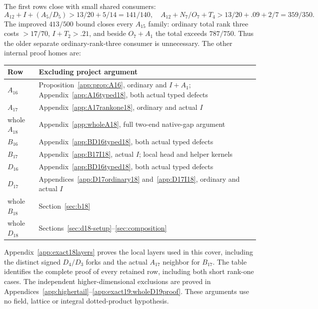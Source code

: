 \documentclass[11pt]{article}
\theoremstyle{definition}
\theoremstyle{remark}
\begin{document}
The first rows close with small shared consumers:
\[
 A_{12}+I+(A_5/D_5)>13/20+5/14=141/140,\quad
 A_{12}+N_7/O_7+T_4>13/20+.09+2/7=359/350.
\]
The improved \(413/500\) bound closes every \(A_{15}\) family:
ordinary total rank three costs \(>17/70\), \(I+T_2>.21\),
and beside \(O_7+A_1\) the total exceeds \(787/750\).
Thus the older separate ordinary-rank-three consumer is unnecessary.
The other internal proof homes are:
\begin{center}\small
\begin{tabular}{lp{.69\linewidth}}
\toprule
Row&Excluding project argument\\ \midrule
\(A_{16}\)&Proposition~\ref{app:prop:A16}, ordinary and \(I+A_1\);
 Appendix~\ref{app:A16typed18}, both actual typed defects\\
\(A_{17}\)&Appendix~\ref{app:A17rankone18}, ordinary and actual \(I\)\\
whole \(A_{18}\)&Appendix~\ref{app:wholeA18}, full two-end native-gap argument\\
\(B_{16}\)&Appendix~\ref{app:BD16typed18}, both actual typed defects\\
\(B_{17}\)&Appendix~\ref{app:B17I18}, actual \(I\); local head and helper kernels\\
\(D_{16}\)&Appendix~\ref{app:BD16typed18}, both actual typed defects\\
\(D_{17}\)&Appendices~\ref{app:D17ordinary18} and~\ref{app:D17I18},
 ordinary and actual \(I\)\\
whole \(B_{18}\)&Section~\ref{sec:b18}\\
whole \(D_{18}\)&Sections~\ref{sec:d18-setup}--\ref{sec:composition}\\
\bottomrule
\end{tabular}
\end{center}
Appendix~\ref{app:exact18layers} proves the local layers used in
this cover, including the distinct signed \(D_4/D_3\) forks and the
actual \(A_{17}\) neighbor for \(B_{17}\). The table identifies the
complete proof of every retained row, including both short rank-one
cases. The independent higher-dimensional exclusions are proved in
Appendices~\ref{app:highertail}--\ref{app:exact19:wholeD19proof}.
These arguments use no field, lattice or integral dotted-product
hypothesis.
\end{document}
